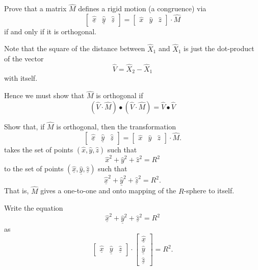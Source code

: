 \documentclass{ximera}
\begin{document}
\begin{problem}
  Prove that a matrix $\hat{M}$ defines a rigid motion (a congruence)
  via
  \[
\begin{bmatrix}
\underline{\hat{x}} & \underline{\hat{y}} & \underline{\hat{z}}%
\end{bmatrix}
=
\begin{bmatrix} \hat{x} & \hat{y} & \hat{z}%
\end{bmatrix}
\cdot\hat{M}
  \]
  if and only if it is orthogonal.

  \begin{hint}
    Note that the square of the distance between $\hat{X}_{1}$ and
    $\hat{X}_{1}$ is just the dot-product of the vector%
    \[
    \hat{V}=\hat{X}_{2}-\hat{X}_{1}%
    \]
    with itself. 
  \end{hint}
  \begin{hint}
    Hence we must show that $\hat{M}$ is orthogonal if
    \[
    \left(  \hat{V}  \cdot\hat{M} \right) \bullet\left(
    \hat{V}  \cdot\hat{M}\right)  =\hat{V}\bullet\hat{V}%
    \]
  \end{hint}
\end{problem}


\begin{problem}
  Show that, if $\hat{M}$ is orthogonal, then the transformation
  \[
  \begin{bmatrix}
    \underline{\hat{x}} & \underline{\hat{y}} & \underline{\hat{z}}
  \end{bmatrix}
  =
  \begin{bmatrix}
    \hat{x} & \hat{y} & \hat{z}
  \end{bmatrix}
  \cdot \hat{M}.
  \]
  takes the set of points $\left(\hat{x},\hat{y},\hat{z}\right)$ such
  that
\[
\hat{x}^2 + \hat{y}^2 + \hat{z}^2 = R^2
\]
to the set of points
$\left(\underline{\hat{x}},\underline{\hat{y}},\underline{\hat{z}}\right)$
such that
\[
\underline{\hat{x}}^2 + \underline{\hat{y}}^{2} + \underline{\hat{z}}^{2}=R^2.
\]
That is, $\hat{M}$ gives a one-to-one and onto mapping of the $R$-sphere to
itself.
\begin{hint}
  Write the equation
  \[
  \underline{\hat{x}}^2 + \underline{\hat{y}}^{2} + \underline{\hat{z}}^{2}=R^2
  \]
  as
  \[
  \begin{bmatrix}
    \underline{\hat{x}} & \underline{\hat{y}} & \underline{\hat{z}}%
  \end{bmatrix}  
  \cdot
  \begin{bmatrix}
    \underline{\hat{x}}\\
    \underline{\hat{y}}\\
    \underline{\hat{z}}
  \end{bmatrix}  =R^2.
  \]
\end{hint}
\end{problem}
\end{document}

